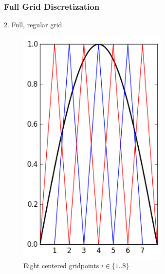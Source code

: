 \begin{frame}
  \frametitle{Full Grid Discretization}
  \topline
  \vspace{-10px}
  \begin{block}{2. Full, regular grid}
    \begin{figure}[!htp]

      \centering
      \includegraphics[width=7.5cm]{images/singlebasis_2}
      \vspace{-12px}
      \caption{Eight centered gridpoints $i \in \{1..8\}$}
    \end{figure}
  \end{block}
\end{frame}

